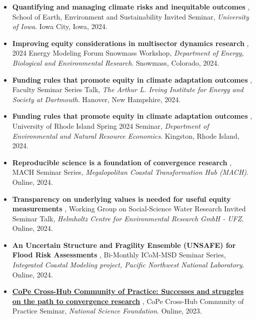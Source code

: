 \documentclass[10pt,oneside]{article}
\begin{document}
\begin{itemize}[label={}]
  \item

\textbf{Quantifying and managing climate risks and inequitable outcomes}
, School of Earth, Environment and Sustainability Invited Seminar, \textit{University of Iowa}. Iowa City, Iowa, 2024.
  
  \item

\textbf{Improving equity considerations in multisector dynamics research}
, 2024 Energy Modeling Forum Snowmass Workshop, \textit{Department of Energy, Biological and Environmental Research}. Snowmass, Colorado, 2024.
  
  \item

\textbf{Funding rules that promote equity in climate adaptation outcomes}
, Faculty Seminar Series Talk, \textit{The Arthur L. Irving Institute for Energy and Society at Dartmouth}. Hanover, New Hampshire, 2024.
  
  \item

\textbf{Funding rules that promote equity in climate adaptation outcomes}
, University of Rhode Island Spring 2024 Seminar, \textit{Department of Environmental and Natural Resource Economics}. Kingston, Rhode Island, 2024.
  
  \item

\textbf{Reproducible science is a foundation of convergence research}
, MACH Seminar Series, \textit{Megalopolitan Coastal Transformation Hub (MACH)}. Online, 2024.
  
  \item

\textbf{Transparency on underlying values is needed for useful equity measurements}
, Working Group on Social-Science Water Research Invited Seminar Talk, \textit{Helmholtz Centre for Environmental Research GmbH - UFZ}. Online, 2024.
  
  \item

\textbf{An Uncertain Structure and Fragility Ensemble (UNSAFE) for Flood Risk Assessments}
, Bi-Monthly ICoM-MSD Seminar Series, \textit{Integrated Coastal Modeling project, Pacific Northwest National Laboratory}. Online, 2024.
  
  \item

\href{https://zenodo.org/doi/10.5281/zenodo.10137316}{\textbf{CoPe Cross-Hub Community of Practice: Successes and struggles on the path to convergence research}}
, CoPe Cross-Hub Community of Practice Seminar, \textit{National Science Foundation}. Online, 2023.
  

\end{itemize}
\end{document}
